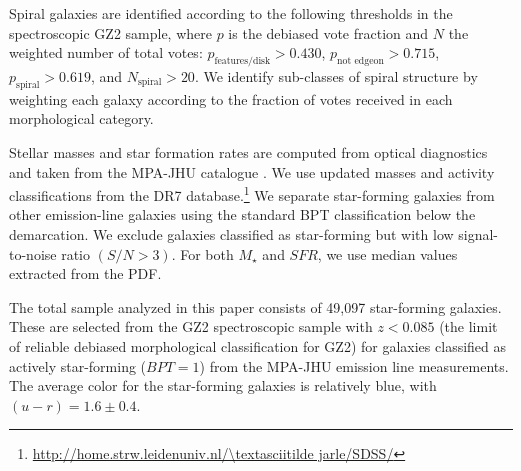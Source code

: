 \documentclass[useAMS,usenatbib]{mn2e}
\newcommand{\mytilde}{\textasciitilde}
\begin{document}
Spiral galaxies are identified according to the following thresholds in the spectroscopic GZ2 sample, where $p$ is the debiased vote fraction and $N$ the weighted number of total votes: $p_\textrm{features/disk} > 0.430$, $p_\textrm{not~edgeon} > 0.715$, $p_\textrm{spiral}>0.619$, and $N_\textrm{spiral}>20$. We identify sub-classes of spiral structure by weighting each galaxy according to the fraction of votes received in each morphological category. 

Stellar masses and star formation rates are computed from optical diagnostics and taken from the MPA-JHU catalogue \citep{kau03a,bri04,sal07}. We use updated masses and activity classifications from the DR7 database.\footnote{\url{http://home.strw.leidenuniv.nl/\mytilde jarle/SDSS/}} We separate star-forming galaxies from other emission-line galaxies using the standard BPT classification \citep*{bal81} below the \citet{kau03} demarcation. We exclude galaxies classified as star-forming but with low signal-to-noise ratio $(S/N > 3)$. For both $M_\star$ and $SFR$, we use median values extracted from the PDF.

The total sample analyzed in this paper consists of 49,097 star-forming galaxies. These are selected from the GZ2 spectroscopic sample with $z<0.085$ (the limit of reliable debiased morphological classification for GZ2) for galaxies classified as actively star-forming ($BPT=1$) from the MPA-JHU emission line measurements. The average color for the star-forming galaxies is relatively blue, with $(u-r)=1.6\pm0.4$. 
\end{document}

